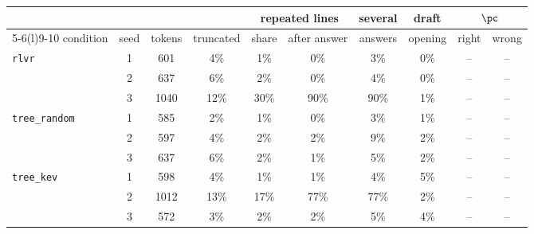 \begin{tabular}{@{}lccccccccc@{}}
\toprule
 & & & & \multicolumn{2}{c}{repeated lines} & several & draft & \multicolumn{2}{c}{\kev{} $\pc$} \\ \cmidrule(lr){5-6}\cmidrule(l){9-10}
condition & seed & tokens & truncated & share & after answer & answers & opening & right & wrong \\ \midrule
\texttt{rlvr} & 1 & 601 & 4\% & 1\% & 0\% & 3\% & 0\% & -- & -- \\
 & 2 & 637 & 6\% & 2\% & 0\% & 4\% & 0\% & -- & -- \\
 & 3 & 1040 & 12\% & 30\% & 90\% & 90\% & 1\% & -- & -- \\
\addlinespace
\texttt{tree\_random} & 1 & 585 & 2\% & 1\% & 0\% & 3\% & 1\% & -- & -- \\
 & 2 & 597 & 4\% & 2\% & 2\% & 9\% & 2\% & -- & -- \\
 & 3 & 637 & 6\% & 2\% & 1\% & 5\% & 2\% & -- & -- \\
\addlinespace
\texttt{tree\_kev} & 1 & 598 & 4\% & 1\% & 1\% & 4\% & 5\% & -- & -- \\
 & 2 & 1012 & 13\% & 17\% & 77\% & 77\% & 2\% & -- & -- \\
 & 3 & 572 & 3\% & 2\% & 2\% & 5\% & 4\% & -- & -- \\
\bottomrule
\end{tabular}
